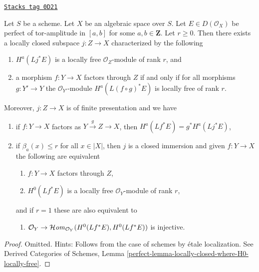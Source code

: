 \begin{lemma}
\label{spaces-perfect-lemma-locally-closed-where-H0-locally-free}
\href{https://stacks.math.columbia.edu/tag/0D21}{\texttt{Stacks tag 0D21}}

Let $S$ be a scheme. Let $X$ be an algebraic space over $S$.
Let $E \in D(\mathcal{O}_X)$ be perfect
of tor-amplitude in $[a, b]$ for some $a, b \in \mathbf{Z}$.
Let $r \geq 0$.
Then there exists a locally closed subspace $j : Z \to X$
characterized by the following
\begin{enumerate}
\item $H^a(Lj^*E)$ is a locally free $\mathcal{O}_Z$-module of rank $r$, and
\item a morphism $f : Y \to X$ factors through $Z$ if and only if
for all morphisms $g : Y' \to Y$ the $\mathcal{O}_{Y'}$-module
$H^a(L(f \circ g)^*E)$ is locally free of rank $r$.
\end{enumerate}
Moreover, $j : Z \to X$ is of finite presentation and we have
\begin{enumerate}
\item[(3)] if $f : Y \to X$ factors as $Y \xrightarrow{g} Z \to X$, then
$H^a(Lf^*E) = g^*H^a(Lj^*E)$,
\item[(4)] if $\beta_a(x) \leq r$ for all $x \in |X|$, then $j$ is
a closed immersion and given $f : Y \to X$ the following are equivalent
\begin{enumerate}
\item $f : Y \to X$ factors through $Z$,
\item $H^0(Lf^*E)$ is a locally free $\mathcal{O}_Y$-module of rank $r$,
\end{enumerate}
and if $r = 1$ these are also equivalent to
\begin{enumerate}
\item[(c)] $\mathcal{O}_Y \to \mathcal{H}\mathit{om}_{\mathcal{O}_Y}(H^0(Lf^*E), H^0(Lf^*E))$
is injective.
\end{enumerate}
\end{enumerate}
\end{lemma}

\begin{proof}
Omitted. Hints:
Follows from the case of schemes by \'etale localization. See
Derived Categories of Schemes, Lemma
\ref{perfect-lemma-locally-closed-where-H0-locally-free}.
\end{proof}

